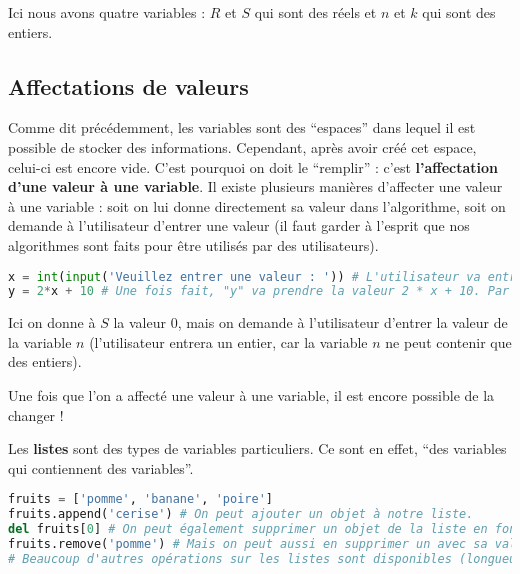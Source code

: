 	\begin{tip}
		Ici nous avons quatre variables : $R$ et $S$ qui sont des réels et $n$ et $k$ qui sont des entiers.
	\end{tip}

	\subsection{Affectations de valeurs}

	Comme dit précédemment, les variables sont des ``espaces'' dans lequel il est possible de stocker des informations.
	\newpar
	Cependant, après avoir créé cet espace, celui-ci est encore vide. C'est pourquoi on doit le ``remplir'' : c'est \textbf{l'affectation d'une valeur à une variable}.
	\newpar
	Il existe plusieurs manières d'affecter une valeur à une variable : soit on lui donne directement sa valeur dans l'algorithme, soit on demande à l'utilisateur d'entrer une valeur (il faut garder à l'esprit que nos algorithmes sont faits pour être utilisés par des utilisateurs).

	\begin{formula}[En python]
		\entretitreetliste
\begin{lstlisting}[language=python]
x = int(input('Veuillez entrer une valeur : ')) # L'utilisateur va entrer une valeur, on la convertir en entier et on va affecter celui-ci à notre variable "x".
y = 2*x + 10 # Une fois fait, "y" va prendre la valeur 2 * x + 10. Par exemple, si l'utilisateur entre "10", "y" vaudra 30.
\end{lstlisting}
	\end{formula}

	\begin{tip}
		Ici on donne à $S$ la valeur $0$, mais on demande à l'utilisateur d'entrer la valeur de la variable $n$ (l'utilisateur entrera un entier, car la variable $n$ ne peut contenir que des entiers).
	\end{tip}

	Une fois que l'on a affecté une valeur à une variable, il est encore possible de la changer !

	Les \textbf{listes} sont des types de variables particuliers. Ce sont en effet, ``des variables qui contiennent des variables''.

	\begin{formula}[En python]
		\entretitreetliste
\begin{lstlisting}[language=python]
fruits = ['pomme', 'banane', 'poire']
fruits.append('cerise') # On peut ajouter un objet à notre liste.
del fruits[0] # On peut également supprimer un objet de la liste en fonction de son index (ici, on supprime le premier).
fruits.remove('pomme') # Mais on peut aussi en supprimer un avec sa valeur.
# Beaucoup d'autres opérations sur les listes sont disponibles (longueur, renversement, ...). N'hésitez pas à vous renseigner !
\end{lstlisting}
	\end{formula}

